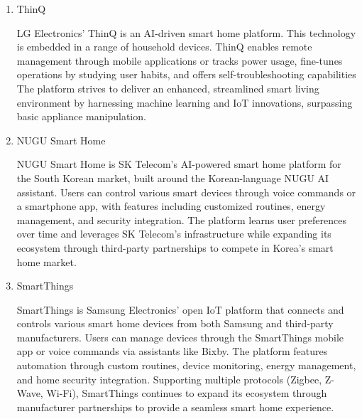 \documentclass[conference]{IEEEtran}
\begin{document}
\begin{enumerate}[label=\arabic*]
    \item ThinQ\par
    \vspace{0.3em}
    LG Electronics’ ThinQ is an AI-driven smart home platform. This technology is embedded in a range of household devices. ThinQ enables remote management through mobile applications or  tracks power usage, fine-tunes operations by studying user habits, and offers self-troubleshooting capabilities The platform strives to deliver an enhanced, streamlined smart living environment by harnessing machine learning and IoT innovations, surpassing basic appliance manipulation.
    
    \vspace{1em}

    \item NUGU Smart Home\par
    \vspace{0.3em}
    NUGU Smart Home is SK Telecom's AI-powered smart home platform for the South Korean market, built around the Korean-language NUGU AI assistant. Users can control various smart devices through voice commands or a smartphone app, with features including customized routines, energy management, and security integration. The platform learns user preferences over time and leverages SK Telecom's infrastructure while expanding its ecosystem through third-party partnerships to compete in Korea's smart home market.
    
    \vspace{1em}

    \item SmartThings\par
    \vspace{0.3em}
    SmartThings is Samsung Electronics' open IoT platform that connects and controls various smart home devices from both Samsung and third-party manufacturers. Users can manage devices through the SmartThings mobile app or voice commands via assistants like Bixby. The platform features automation through custom routines, device monitoring, energy management, and home security integration. Supporting multiple protocols (Zigbee, Z-Wave, Wi-Fi), SmartThings continues to expand its ecosystem through manufacturer partnerships to provide a seamless smart home experience.

    \vspace{1em}
    

\end{enumerate}
\end{document}
